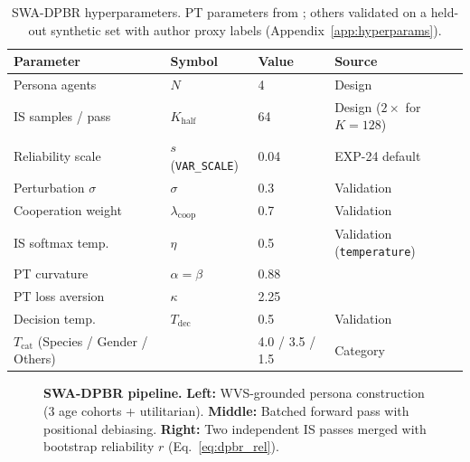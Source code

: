 \documentclass{article}
\begin{document}
\begin{table}[t]
\caption{SWA-DPBR hyperparameters. PT parameters from \citet{kahneman1979prospect};
others validated on a held-out synthetic set with author proxy labels
(Appendix~\ref{app:hyperparams}).}
\label{tab:hyperparams}
\centering\small
\begin{tabular}{llll}
\toprule
Parameter & Symbol & Value & Source \\
\midrule
Persona agents        & $N$                     & 4     & Design \\
IS samples / pass     & $K_{\text{half}}$       & 64    & Design ($2{\times}$ for $K{=}128$) \\
Reliability scale     & $s$ (\texttt{VAR\_SCALE}) & 0.04 & EXP-24 default \\
Perturbation $\sigma$ & $\sigma$                & 0.3   & Validation \\
Cooperation weight    & $\lambda_{\text{coop}}$ & 0.7   & Validation \\
IS softmax temp.      & $\eta$                  & 0.5   & Validation (\texttt{temperature}) \\
PT curvature          & $\alpha{=}\beta$        & 0.88  & \citet{kahneman1979prospect} \\
PT loss aversion      & $\kappa$                & 2.25  & \citet{kahneman1979prospect} \\
Decision temp.        & $T_{\text{dec}}$        & 0.5   & Validation \\
$T_{\text{cat}}$ (Species / Gender / Others) & & 4.0 / 3.5 / 1.5 & Category \\
\bottomrule
\end{tabular}
\end{table}

\begin{figure}[t]
  \centering
  \caption{%
    \textbf{SWA-DPBR pipeline.}
    \textbf{Left:} WVS-grounded persona construction (3 age cohorts + utilitarian).
    \textbf{Middle:} Batched forward pass with positional debiasing.
    \textbf{Right:} Two independent IS passes merged with bootstrap reliability $r$ (Eq.~\ref{eq:dpbr_rel}).
  }
  \label{fig:overview}
\end{figure}
\end{document}

